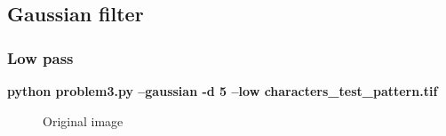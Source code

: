     \pagebreak
    \subsection{Gaussian filter}

        \subsubsection{Low pass}

        \small{\textbf{python problem3.py --gaussian -d 5 --low characters\_test\_pattern.tif}}

        \begin{figure}[!htb]\centering
            \begin{minipage}{0.40\textwidth}
                \caption{Original image}
            \end{minipage}
            \begin{minipage}{0.40\textwidth}

\end{minipage}
\end{figure}
